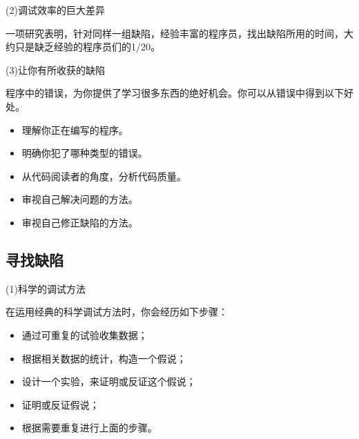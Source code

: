 \documentclass{article}
\begin{document}
\par
(2)调试效率的巨大差异
\par
一项研究表明，针对同样一组缺陷，经验丰富的程序员，找出缺陷所用的时间，大约只是缺乏经验的程序员们的1/20。

\par
(3)让你有所收获的缺陷
\par
程序中的错误，为你提供了学习很多东西的绝好机会。你可以从错误中得到以下好处。
\begin{itemize}
    \item 理解你正在编写的程序。
    \item 明确你犯了哪种类型的错误。
    \item 从代码阅读者的角度，分析代码质量。
    \item 审视自己解决问题的方法。
    \item 审视自己修正缺陷的方法。
\end{itemize}

\subsection{寻找缺陷}
\par
(1)科学的调试方法
\par
在运用经典的科学调试方法时，你会经历如下步骤：
\begin{itemize}
    \item 通过可重复的试验收集数据；
    \item 根据相关数据的统计，构造一个假说；
    \item 设计一个实验，来证明或反证这个假说；
    \item 证明或反证假说；
    \item 根据需要重复进行上面的步骤。
\end{itemize}
\end{document}
